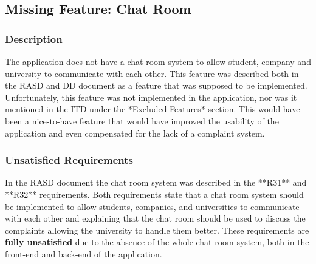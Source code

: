 \subsection{Missing Feature: Chat Room}
\subsubsection{Description}
The application does not have a chat room system to allow student, company and university to communicate with each other. This feature was described both in the RASD and DD document as a feature that was supposed to be implemented. \\
Unfortunately, this feature was not implemented in the application, nor was it mentioned in the ITD under the *Excluded Features* section. This would have been a nice-to-have feature that would have improved the usability of the application and even compensated for the lack of a complaint system.\\
\subsubsection{Unsatisfied Requirements}
In the RASD document the chat room system was described in the **R31** and **R32** requirements. Both requirements state that a chat room system should be implemented to allow students, companies, and universities to communicate with each other and explaining that the chat room should be used to discuss the complaints allowing the university to handle them better. These requirements are \textbf{fully unsatisfied} due to the absence of the whole chat room system, both in the front-end and back-end of the application.

    



